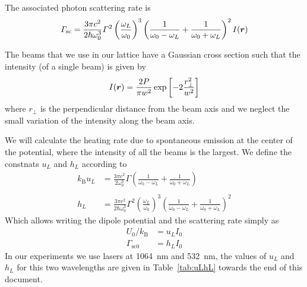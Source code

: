 The associated photon scattering rate is 
\begin{equation}
  \Gamma_{\text{sc}} = 
  \frac{3\pi c^{2}}{ 2 \hbar \omega_{0}^{3} } \Gamma^{2} 
  \left( \frac{ \omega_{L} }{ \omega_{0} } \right)^{3} 
  \left( \frac{1}{\omega_{0} - \omega_{L}} + \frac{1}{\omega_{0} 
   + \omega_{L}}  \right)^{2} I(\bm{r})
\end{equation} 
  

The beams that we use in our lattice have a Gaussian cross section such
that the intensity (of a single beam) is given by
\begin{equation}
  I(\bm{r}) = \frac{2P}{\pi w^{2}}  
   \exp\left[ -2\frac{r_{\perp}^{2} }{w^{2}}  \right]
\end{equation}
where $r_{\perp}$ is the perpendicular distance from the beam axis and we
neglect the small variation of the intensity along the beam axis.

We will calculate the heating rate due to spontaneous emission at the center
of the potential, where the intensity of all the beams is the largest.   We define the constnats $u_{L}$ and $h_{L}$ according to 
\begin{equation}
\begin{split}
  k_{\text{B}}  u_{L} & =  
  \frac{3 \pi c^{2}}{ 2 \omega_{0}^{3} } \Gamma
  \left( \frac{1}{\omega_{0} - \omega_{L}} + \frac{1}{\omega_{0} 
   + \omega_{L}}  \right)  \\ 
 &  \\ 
 h_{L} & =
  \frac{3 \pi c^{2}}{  2 \hbar \omega_{0}^{3} } \Gamma^{2} 
  \left( \frac{ \omega_{L} }{ \omega_{0} } \right)^{3} 
  \left( \frac{1}{\omega_{0} - \omega_{L}} + \frac{1}{\omega_{0} 
   + \omega_{L}}  \right)^{2} 
\end{split}
\end{equation}
Which allows writing the dipole potential and the scattering rate simply as
\begin{equation}
\begin{split} 
 U_{0}/k_{\text{B}} &  = u_{L} I_{0} \\ 
 \Gamma_{\text{sc0}} &  = h_{L} I_{0}
\end{split}
\label{eq:uLhL}
\end{equation}
In our experiments we use lasers at 1064~nm and 532~nm, the values of $u_{L}$
and $h_{L}$ for this two wavelengths are given in Table~\ref{tab:uLhL} towards
the end of this document.

